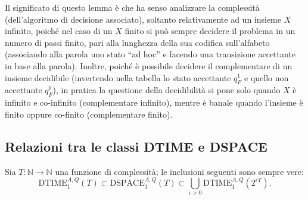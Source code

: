 \begin{rema} Il significato di questo lemma è che ha senso analizzare la complessità (dell'algoritmo di decisione associato), soltanto relativamente ad un insieme $X$ infinito, poiché nel caso di un $X$ finito si può sempre decidere il problema in un numero di passi finito, pari alla lunghezza della sua codifica sull'alfabeto (associando alla parola uno stato ``ad hoc'' e facendo una transizione accettante in base alla parola). Inoltre, poiché è possibile decidere il complementare di un insieme decidibile (invertendo nella tabella lo stato accettante $q_F^1$ e quello non accettante $q_F^0$), in pratica la questione della decidibilità si pone solo quando $X$ è infinito e co-infinito (complementare infinito), mentre è banale quando l'insieme è finito oppure co-finito (complementare finito).
\end{rema}

\subsection{Relazioni tra le classi DTIME e DSPACE}

\begin{prop}
Sia $T : \mathbb{N} \to \mathbb{N}$ una funzione di complessità; le inclusioni seguenti sono sempre vere:
\[
\mathrm{DTIME}_1^{A,Q}(T) \subset \mathrm{DSPACE}_1^{A,Q}(T) \subset \bigcup_{\epsilon > 0} \mathrm{DTIME}_1^{A,Q}(2^{\epsilon T}).
\]
\end{prop}

